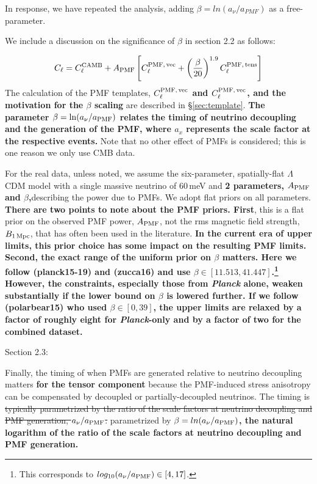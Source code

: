 \documentclass{article}
\newcommand{\cpmftens}{\ensuremath{C_{\ell}^{\rm PMF,\,tens}}}
\newcommand{\cpmfvec}{\ensuremath{C_{\ell}^{\rm PMF,\,vec}}}
\newcommand{\apmf}{\ensuremath{A_{\rm PMF}}}
\newcommand{\bpmf}{\ensuremath{B_{\rm 1\,Mpc}}}
\newcommand{\lcdm}{\ensuremath{\Lambda}CDM}
\newcommand{\be}{\begin{equation}}
\newcommand{\ee}{\end{equation}}
\newcommand{\planck}{{\sl Planck}}
\newcommand{\removed}[1]{\st{#1}}
\newcommand{\added}[1]{\textbf{#1}}
\newcommand{\diff}[1]{\textcolor{PineGreen}{#1}}
\begin{document}
In response, we have repeated the analysis, adding $\beta = ln(a_{\nu}/a_{PMF})$ as a free-parameter.

We include a discussion on the significance of $\beta$ in section 2.2 as follows:

\diff{
\be
C_\ell = C_\ell^{\rm{CAMB}} + \apmf \left[\cpmfvec + \left(\frac{\beta}{20}\right)^{1.9}  \cpmftens \right]
\ee
The calculation of the PMF templates,\added{ \cpmfvec{} and \cpmfvec{}, and the motivation for the $\beta$ scaling} are described in \S\ref{sec:template}. 
\added{The parameter $\beta = {\rm ln}(a_{\nu}/a_{\rm{PMF}})$ relates the timing of neutrino decoupling and the generation of the PMF, where $a_x$ represents the scale factor at the respective events.} Note that no other effect of  PMFs is considered; this is one reason we only use CMB data.}

\diff{For the real data, unless noted, we assume the six-parameter, spatially-flat \lcdm{} model with a single massive neutrino of 60\,meV and \added{2 parameters, \apmf{} and $\beta$,}describing the power due to PMFs.
We adopt flat priors on all parameters. 
\added{There are two points to note about the PMF priors. 
First}, this is a flat prior on the observed PMF power, $\apmf$, not the rms magnetic field strength, \bpmf, that has often been used in the literature. 
\added{In the current era of upper limits, this prior choice has some impact on the resulting PMF limits. 
Second, the exact range of the uniform prior on $\beta$ matters. 
Here we follow (planck15-19) and  (zucca16) and use $\beta \in [11.513, 41.447]$.\footnote{This corresponds to $log_{10} (a_{\nu}/a_{\rm{PMF}}) \in[4,17]$.}
However, the constraints, especially those from \planck{} alone, weaken substantially if the lower bound on $\beta$ is lowered further. 
If we follow (polarbear15) who used $\beta \in [0,39]$, the upper limits are relaxed by a factor of roughly eight for \planck-only and by a factor of two for the combined dataset.}}

Section 2.3:

\diff{Finally, the timing of when PMFs are generated relative to neutrino decoupling matters \added{for the tensor component} because the PMF-induced stress anisotropy can be compensated by decoupled or partially-decoupled neutrinos. 
The timing is \removed{typically parametrized by the ratio of the scale factors at neutrino decoupling and PMF generation, $a_{\nu}/a_{\rm{PMF}}$.} parametrized by \added{$\beta = ln(a_{\nu}/a_{\rm{PMF}})$,  the natural logarithm of the ratio of the scale factors at neutrino decoupling and PMF generation.}}
\end{document}
